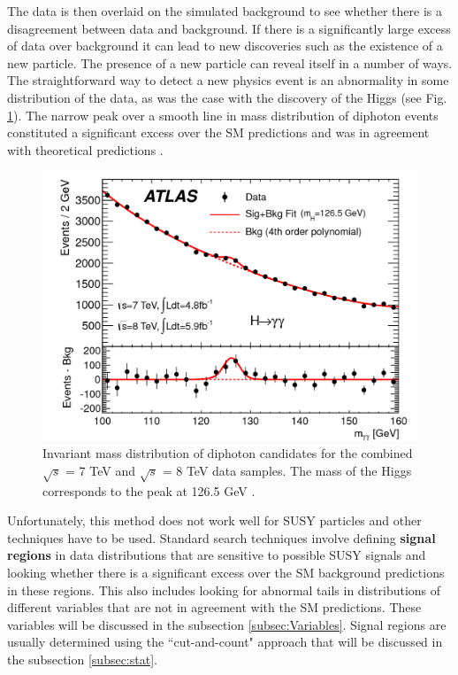 The data is then overlaid on the simulated background to see whether there is a disagreement between data and background. If there is a significantly large excess of data over background it can lead to new discoveries such as the existence of a new particle.  The presence of a new particle can reveal itself in a number of ways. The straightforward way to detect a new physics event is an abnormality in some distribution of the data, as was the case with the discovery of the Higgs (see Fig. \ref{Higgs}). The narrow peak over a smooth line in mass distribution of diphoton events constituted a significant excess over the SM predictions and was in agreement with theoretical predictions \citep{Aad:2012tfa}. 

\begin{figure}[!h]
	\centering
	\captionsetup{width=0.8\textwidth}
	\includegraphics[scale=0.2]{Chap3/figaux_004a}
	\caption[Invariant mass of diphoton events: discovery of the Higgs]{Invariant mass distribution of diphoton 				candidates for the combined $\sqrt{s}$ = 7 TeV and $\sqrt{s}$ = 8 TeV 			data samples. The mass of the Higgs corresponds to the peak at 126.5 				GeV \citep{Aad:2012tfa}.}
	\label{Higgs}
\end{figure}

Unfortunately, this method does not work well for SUSY particles and other techniques have to be used. Standard search techniques involve defining \textbf{signal regions} in data distributions that are sensitive to possible SUSY signals and looking whether there is a significant excess over the SM background predictions in these regions. 
This also includes looking for abnormal tails in distributions of different variables that are not in agreement with the SM predictions. These variables will be discussed in the subsection \ref{subsec:Variables}. Signal regions are usually determined using the ``cut-and-count" approach that will be discussed in the subsection \ref{subsec:stat}.

